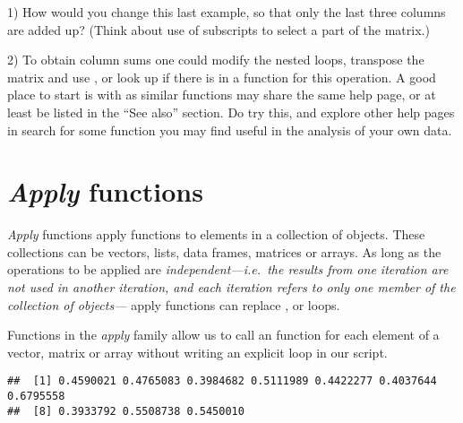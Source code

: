\documentclass[krantz2]{krantz}\usepackage{knitr}%
\begin{document}
\begin{playground}
1) How would you change this last example, so that only the last three columns are added up? (Think about use of subscripts to select a part of the matrix.)

2) To obtain column sums one could modify the nested loops, transpose the matrix and use , or look up if there is in \Rlang a function for this operation. A good place to start is with  as similar functions may share the same help page, or at least be listed in the ``See also'' section. Do try this, and explore other help pages in search for some function you may find useful in the analysis of your own data.
\end{playground}

\section[Apply functions]{\emph{Apply} functions}\label{sec:data:apply}

\emph{Apply}
 functions apply functions to elements in a collection of \Rlang objects. These collections can be vectors, lists, data frames, matrices or arrays. As long as the operations to be applied are \emph{independent---i.e.\ the results from one iteration are not used in another iteration, and each iteration refers to only one member of the collection of objects---} apply functions can replace ,  or  loops.

Functions in the \emph{apply} family allow us to call an \Rlang function for each element of a vector, matrix or array without writing an explicit loop in our script.

\begin{knitrout}\footnotesize
{}\color{fgcolor}\begin{kframe}
\begin{alltt}
 \hlkwb{<-} \hlstd{(}\hlstd{(}\hlstd{),}  \hlstd{=} \hlstd{)}
  \hlstd{=} \hlstd{,}  
\end{alltt}
\begin{verbatim}
##  [1] 0.4590021 0.4765083 0.3984682 0.5111989 0.4422277 0.4037644 0.6795558
##  [8] 0.3933792 0.5508738 0.5450010
\end{verbatim}
\end{kframe}
\end{knitrout}
\end{document}
